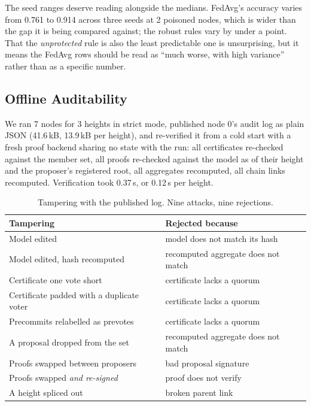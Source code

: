 \documentclass{llncs}
\begin{document}
The seed ranges deserve reading alongside the medians. FedAvg's accuracy varies
from 0.761 to 0.914 across three seeds at 2 poisoned nodes, which is wider than
the gap it is being compared against; the robust rules vary by under a point.
That the \emph{unprotected} rule is also the least predictable one is
unsurprising, but it means the FedAvg rows should be read as ``much worse, with
high variance'' rather than as a specific number.

\subsection{Offline Auditability}
\label{sec:eval-audit}

We ran 7 nodes for 3 heights in strict mode, published node 0's audit log as
plain JSON (41.6\,kB, 13.9\,kB per height), and
re-verified it from a cold start with a fresh proof backend sharing no state
with the run: all certificates re-checked against the member set, all proofs
re-checked against the model as of their height and the proposer's registered
root, all aggregates recomputed, all chain links recomputed. Verification took
0.37\,s, or 0.12\,s per height.

\begin{table}[t]
\centering
\caption{Tampering with the published log. Nine attacks, nine rejections.}
\label{tab:tamper}
\begin{tabular}{ll}
\toprule
\textbf{Tampering} & \textbf{Rejected because} \\
\midrule
Model edited                        & model does not match its hash \\
Model edited, hash recomputed       & recomputed aggregate does not match \\
Certificate one vote short          & certificate lacks a quorum \\
Certificate padded with a duplicate voter & certificate lacks a quorum \\
Precommits relabelled as prevotes   & certificate lacks a quorum \\
A proposal dropped from the set     & recomputed aggregate does not match \\
Proofs swapped between proposers    & bad proposal signature \\
Proofs swapped \emph{and re-signed} & proof does not verify \\
A height spliced out                & broken parent link \\
\bottomrule
\end{tabular}
\end{table}
\end{document}
